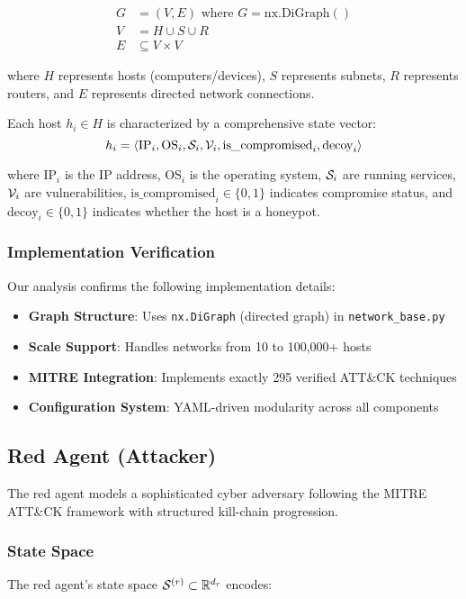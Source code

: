 \documentclass[11pt]{article}
\theoremstyle{definition}
\theoremstyle{plain}
\begin{document}
\begin{align}
G &= (V, E) \text{ where } G = \text{nx.DiGraph}() \\
V &= H \cup S \cup R \\
E &\subseteq V \times V
\end{align}

where $H$ represents hosts (computers/devices), $S$ represents subnets, $R$ represents routers, and $E$ represents directed network connections.

Each host $h_i \in H$ is characterized by a comprehensive state vector:
\begin{equation}
h_i = \langle \text{IP}_i, \text{OS}_i, \mathcal{S}_i, \mathcal{V}_i, \text{is\_compromised}_i, \text{decoy}_i \rangle
\end{equation}

where $\text{IP}_i$ is the IP address, $\text{OS}_i$ is the operating system, $\mathcal{S}_i$ are running services, $\mathcal{V}_i$ are vulnerabilities, $\text{is\_compromised}_i \in \{0,1\}$ indicates compromise status, and $\text{decoy}_i \in \{0,1\}$ indicates whether the host is a honeypot.

\subsubsection{Implementation Verification}
Our analysis confirms the following implementation details:
\begin{itemize}
    \item \textbf{Graph Structure}: Uses \texttt{nx.DiGraph} (directed graph) in \texttt{network\_base.py}
    \item \textbf{Scale Support}: Handles networks from 10 to 100,000+ hosts
    \item \textbf{MITRE Integration}: Implements exactly 295 verified ATT\&CK techniques
    \item \textbf{Configuration System}: YAML-driven modularity across all components
\end{itemize}

\subsection{Red Agent (Attacker)}

The red agent models a sophisticated cyber adversary following the MITRE ATT\&CK framework with structured kill-chain progression.

\subsubsection{State Space}
The red agent's state space $\mathcal{S}^{(r)} \subset \mathbb{R}^{d_r}$ encodes:
\end{document}
